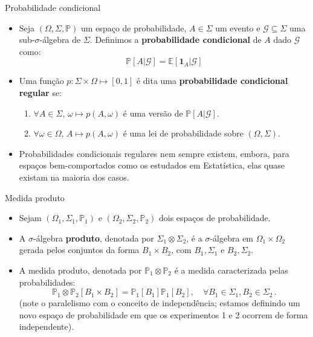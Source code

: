 \documentclass[11pt]{beamer}
\begin{document}
		\begin{frame}{Probabilidade condicional}
\begin{itemize}
	\item Seja $(\Omega, \Sigma,\mathbb{P})$ um espaço de probabilidade, $A \in \Sigma$ um evento e $\mathcal{G}\subseteq \Sigma$ uma sub-$\sigma$-álgebra de $\Sigma$. Definimos a \textbf{probabilidade condicional} de $A$ dado $\mathcal{G}$ como:
	$$\mathbb{P}[A|\mathcal{G}] = \mathbb{E}[\mathbf{1}_{A}|\mathcal{G}]$$
\item Uma função $p: \Sigma \times \Omega \mapsto [0,1]$ é dita uma \textbf{probabilidade condicional regular} se:
\begin{enumerate}
	\item $\forall A \in \Sigma$, $\omega \mapsto p(A,\omega)$ é uma versão de $\mathbb{P}[A|\mathcal{G}]$.
	\item $\forall \omega \in \Omega$, $A \mapsto p(A, \omega)$ é uma lei de probabilidade sobre $(\Omega, \Sigma)$.
\end{enumerate}
\item Probabilidades condicionais regulares nem sempre existem, embora, para espaços bem-comportados como os estudados em Estatística, elas quase existam na maioria dos casos.
\end{itemize}
\end{frame}
\begin{frame}{Medida produto}
	\begin{itemize}
		\item Sejam $(\Omega_1,\Sigma_1,\mathbb{P}_1)$ e $(\Omega_2,\Sigma_2,\mathbb{P}_2)$ dois espaços de probabilidade.
		\item A $\sigma$-álgebra \textbf{produto}, denotada por $\Sigma_1 \otimes \Sigma_2 $, é a $\sigma$-álgebra em $\Omega_1 \times \Omega_2$ gerada pelos conjuntos da forma $B_1 \times B_2$, com $B_1,\Sigma_1$ e $B_2, \Sigma_2$.
		\item A medida produto, denotada por $\mathbb{P}_1\otimes \mathbb{P}_2$ é a medida caracterizada pelas probabilidades:
		$$\mathbb{P}_1\otimes \mathbb{P}_2[B_1 \times B_2] = \mathbb{P}_1[B_1] \mathbb{P}_1[B_2],\quad \forall B_1 \in \Sigma_1,B_2 \in \Sigma_2\,.$$
		(note o paralelismo com o conceito de independência; estamos definindo um novo espaço de probabilidade em que os experimentos 1 e 2 ocorrem de forma independente).
	
	\end{itemize} 
\end{frame}
\end{document}
